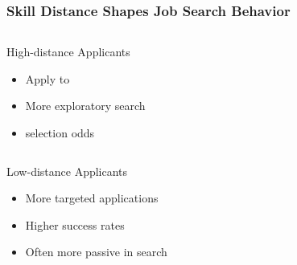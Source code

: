 \documentclass[aspectratio=169]{beamer}
\begin{document}
\begin{frame}
\frametitle{Skill Distance Shapes Job Search Behavior}

\begin{comparison}
\begin{column}{0.48\textwidth}
\begin{block}{High-distance Applicants}
\begin{itemize}
\item Apply to 
\item More exploratory search
\item {} selection odds
\end{itemize}
\end{block}
\end{column}

\begin{column}{0.48\textwidth}
\begin{block}{Low-distance Applicants}
\begin{itemize}
\item More targeted applications
\item Higher success rates
\item Often more passive in search
\end{itemize}
\end{block}
\end{column}
\end{comparison}
\vspace{1em}

\centering
{}
\end{frame}

\end{document}
